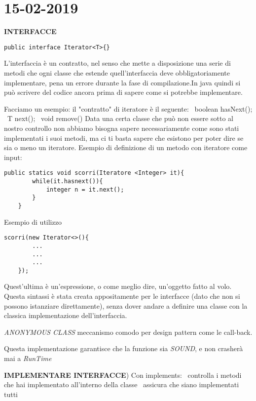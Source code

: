 
 
\newpage
\section{15-02-2019}
\textbf{INTERFACCE}
\begin{lstlisting}[basicstyle=\small,]
	public interface Iterator<T>{}
\end{lstlisting}
L'interfaccia è un contratto, nel senso che mette a disposizione una serie di metodi che ogni classe che estende quell'interfaccia deve obbligatoriamente implementare, pena un errore durante la fase di compilazione.In java quindi si può scrivere del codice ancora prima di sapere come si potrebbe implementare.

\noindent Facciamo un esempio: il "contratto" di iteratore è il seguente: \newline
\textbullet\ boolean hasNext(); \newline
\textbullet\ T next(); \newline
\textbullet\ void remove()\newline
Data una certa classe che può non essere sotto al nostro controllo non abbiamo bisogna sapere necessariamente come sono stati implementati i suoi metodi, ma ci ti basta sapere che esistono per poter dire se sia o meno un iteratore. \newline
Esempio di definizione di un metodo con iteratore come input: 
\begin{lstlisting}[basicstyle=\small,]
	public statics void scorri(Iteratore <Integer> it){
		while(it.hasnext()){
			integer n = it.next();
		}
	}
\end{lstlisting}
Esempio di utilizzo 
\begin{lstlisting}[basicstyle=\small,]
	scorri(new Iterator<>(){
		...
		...
		...
	});
\end{lstlisting}
Quest'ultima è un'espressione, o come meglio dire, un'oggetto fatto al volo. Questa sintassi è stata creata appositamente per le interfacce (dato che non si possono istanziare direttamente), senza dover andare a definire una classe con la classica implementazione dell'interfaccia. 

\noindent \textit{ANONYMOUS CLASS} meccanismo comodo per design pattern come le call-back. 

\noindent Questa implementazione garantisce che la funzione sia \textit{SOUND}, e non crasherà mai a \textit{RunTime}

\noindent \textbf{IMPLEMENTARE INTERFACCE}) Con implements: \newline
\textbullet\ controlla i metodi che hai implementato all'interno della classe \newline
\textbullet\ assicura che siano implementati tutti 

